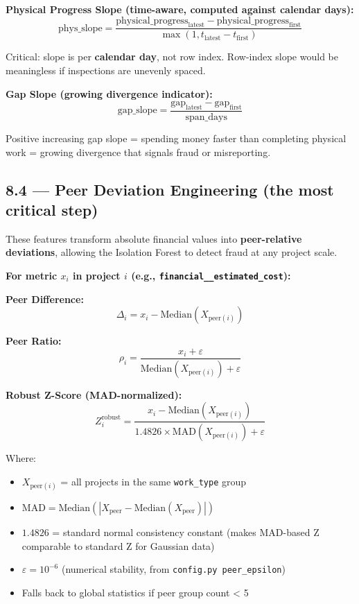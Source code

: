 \documentclass[11pt,a4paper]{article}
\begin{document}
\textbf{Physical Progress Slope (time-aware, computed against calendar days):}
\[ \text{phys\_slope} = \frac{\text{physical\_progress}_\text{latest} - \text{physical\_progress}_\text{first}}{\max(1, t_\text{latest} - t_\text{first})} \]

\begin{tcolorbox}[colback=blue!4!white,colframe=blue!60!black,arc=1.5mm,boxrule=0.7pt,left=8pt,right=8pt,top=6pt,bottom=6pt]
Critical: slope is per \textbf{calendar day}, not row index. Row-index slope would be meaningless if inspections are unevenly spaced.\\
\end{tcolorbox}

\textbf{Gap Slope (growing divergence indicator):}
\[ \text{gap\_slope} = \frac{\text{gap}_\text{latest} - \text{gap}_\text{first}}{\text{span\_days}} \]

\begin{tcolorbox}[colback=blue!4!white,colframe=blue!60!black,arc=1.5mm,boxrule=0.7pt,left=8pt,right=8pt,top=6pt,bottom=6pt]
Positive increasing gap slope = spending money faster than completing physical work = growing divergence that signals fraud or misreporting.\\
\end{tcolorbox}

\subsection{8.4 --- Peer Deviation Engineering (the most critical step)}

These features transform absolute financial values into \textbf{peer-relative deviations}, allowing the Isolation Forest to detect fraud at any project scale.

\textbf{For metric $x_i$ in project $i$ (e.g., \texttt{financial\_\_estimated\_cost}):}

\textbf{Peer Difference:}
\[ \Delta_i = x_i - \text{Median}(X_{\text{peer}(i)}) \]

\textbf{Peer Ratio:}
\[ \rho_i = \frac{x_i + \varepsilon}{\text{Median}(X_{\text{peer}(i)}) + \varepsilon} \]

\textbf{Robust Z-Score (MAD-normalized):}
\[ Z_i^\text{robust} = \frac{x_i - \text{Median}(X_{\text{peer}(i)})}{1.4826 \times \text{MAD}(X_{\text{peer}(i)}) + \varepsilon} \]

Where:
\begin{itemize}[leftmargin=1.5em, itemsep=2pt, topsep=3pt]
\item $X_{\text{peer}(i)}$ = all projects in the same \texttt{work\_type} group
\item $\text{MAD} = \text{Median}(|X_\text{peer} - \text{Median}(X_\text{peer})|)$
\item $1.4826$ = standard normal consistency constant (makes MAD-based Z comparable to standard Z for Gaussian data)
\item $\varepsilon = 10^{-6}$ (numerical stability, from \texttt{config.py peer\_epsilon})
\item Falls back to global statistics if peer group count < 5
\end{itemize}
\end{document}
